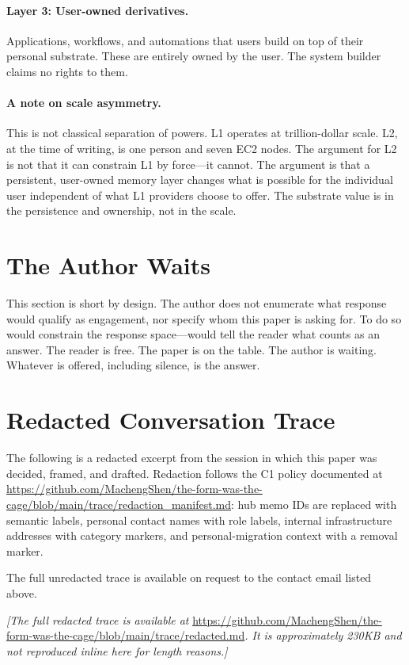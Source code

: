 \documentclass{article}
\begin{document}
\paragraph{Layer 3: User-owned derivatives.}
Applications, workflows, and automations that users build on top of their personal substrate. These are entirely owned by the user. The system builder claims no rights to them.

\paragraph{A note on scale asymmetry.}
This is not classical separation of powers. L1 operates at trillion-dollar scale. L2, at the time of writing, is one person and seven EC2 nodes. The argument for L2 is not that it can constrain L1 by force---it cannot. The argument is that a persistent, user-owned memory layer changes what is possible for the individual user independent of what L1 providers choose to offer. The substrate value is in the persistence and ownership, not in the scale.

\section{The Author Waits}

This section is short by design. The author does not enumerate what response would qualify as engagement, nor specify whom this paper is asking for. To do so would constrain the response space---would tell the reader what counts as an answer. The reader is free. The paper is on the table. The author is waiting. Whatever is offered, including silence, is the answer.

\appendix
\section{Redacted Conversation Trace}

The following is a redacted excerpt from the session in which this paper was decided, framed, and drafted. Redaction follows the C1 policy documented at \url{https://github.com/MachengShen/the-form-was-the-cage/blob/main/trace/redaction_manifest.md}: hub memo IDs are replaced with semantic labels, personal contact names with role labels, internal infrastructure addresses with category markers, and personal-migration context with a removal marker.

The full unredacted trace is available on request to the contact email listed above.

\bigskip
\noindent\textit{[The full redacted trace is available at} \url{https://github.com/MachengShen/the-form-was-the-cage/blob/main/trace/redacted.md}\textit{. It is approximately 230KB and not reproduced inline here for length reasons.]}
\end{document}
